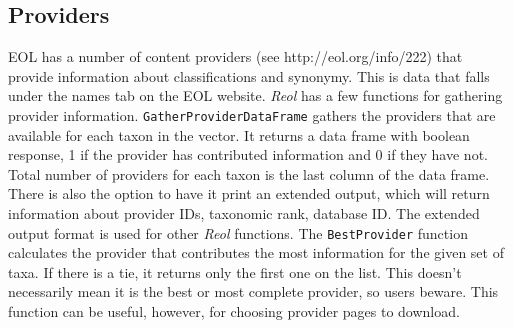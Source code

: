 \documentclass[12pt]{article}
\begin{document}
\subsection{Providers}
EOL has a number of content providers (see http://eol.org/info/222) that provide information about classifications and synonymy. This is data that falls under the names tab on the EOL website. \textit{Reol} has a few functions for gathering provider information. \texttt{GatherProviderDataFrame} gathers the providers that are available for each taxon in the vector. It returns a data frame with boolean response, 1 if the provider has contributed information and 0 if they have not. Total number of providers for each taxon is the last column of the data frame. There is also the option to have it print an extended output, which will return information about provider IDs, taxonomic rank, database ID. The extended output format is used for other \textit{Reol} functions. The \texttt{BestProvider} function calculates the provider that contributes the most information for the given set of taxa. If there is a tie, it returns only the first one on the list. This doesn't necessarily mean it is the best or most complete provider, so users beware. This function can be useful, however, for choosing provider pages to download. 
\end{document}
